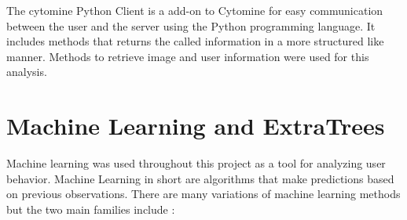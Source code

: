 \documentclass[a4paper,11pt]{report}
\numberwithin{figure}{chapter} %
\begin{document}
    The cytomine Python Client is a add-on to Cytomine for easy communication between the user and the server using the Python programming language.
    It includes methods that returns the called information in a more structured like manner.
    Methods to retrieve image and user information were used for this analysis.

    \section{Machine Learning and ExtraTrees}

    Machine learning was used throughout this project as a tool for analyzing user behavior.
    Machine Learning in short are algorithms that make predictions based on previous observations.
    There are many variations of machine learning methods but the two main families include :
\end{document}

